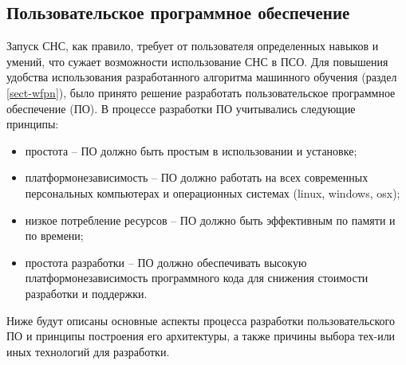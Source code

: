 \subsection{Пользовательское программное обеспечение}\label{sect-7}

Запуск СНС, как правило, требует от пользователя определенных навыков и умений, что сужает возможности использование СНС в ПСО. Для повышения удобства использования разработанного алгоритма машинного обучения (раздел \ref{sect-wfpn}), было принято решение разработать пользовательское программное обеспечение (ПО). В процессе разработки ПО учитывались следующие принципы:
\begin{itemize}
    \item простота -- ПО должно быть простым в использовании и установке;
    \item платформонезависимость -- ПО должно работать на всех современных персональных компьютерах и операционных системах (linux, windows, osx);
    \item низкое потребление ресурсов -- ПО должно быть эффективным по памяти и по времени;
    \item простота разработки -- ПО должно обеспечивать высокую платформонезависимость программного кода для снижения стоимости разработки и поддержки.
\end{itemize}

Ниже будут описаны основные аспекты процесса разработки пользовательского ПО и принципы построения его архитектуры, а также причины выбора тех-или иных технологий для разработки.


